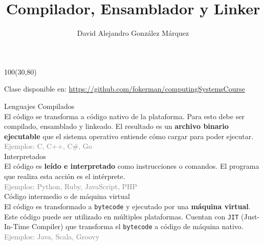 \documentclass[aspectratio=169]{beamer}
\title{\Huge Compilador, Ensamblador y Linker}
\author{David Alejandro González Márquez}
\date{}
\begin{document}
\begin{frame}[plain]
    \titlepage
    \begin{textblock}{100}(30,80)
    \begin{tcolorbox}[size=small,width=\textwidth,colback={gray!30},title={}]
    \begin{center}
     \scriptsize Clase disponible en: \url{https://github.com/fokerman/computingSystemsCourse}
    \end{center}
    \end{tcolorbox}
    \end{textblock}
\end{frame}

\begin{frame}[fragile,t]{Lenguajes}
    \textcolor{naranjauca}{Compilados}\\
    El código se transforma a código nativo de la plataforma. Para esto debe ser compilado, ensamblado y linkeado.
    El resultado es un \textbf{archivo binario ejecutable} que el sistema operativo entiende cómo cargar para poder ejecutar.\\
    \textcolor{gray}{Ejemplos: C, C++, C\#, Go}\\
    \vspace{0.2cm}
    \pause
    \textcolor{naranjauca}{Interpretados}\\
    El código es \textbf{leído e interpretado} como instrucciones o comandos. El programa que realiza esta acción es el intérprete.\\ 
    \textcolor{gray}{Ejemplos: Python, Ruby, JavaScript, PHP}\\
    \vspace{0.2cm}
    \pause
    \textcolor{naranjauca}{Código intermedio o de máquina virtual}\\
    El código es transformado a \texttt{bytecode} y ejecutado por una \textbf{máquina virtual}. Este código puede ser utilizado en múltiples plataformas.
    Cuentan con \texttt{JIT} (Just-In-Time Compiler) que transforma el \texttt{bytecode} a código de máquina nativo.\\
    \textcolor{gray}{Ejemplos: Java, Scala, Groovy}\\
\end{frame}
\end{document}
